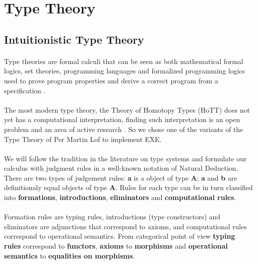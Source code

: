\documentclass[11pt,oneside]{article}
\begin{document}
\newpage
\section{Type Theory}

\subsection{Intuitionistic Type Theory}

\paragraph{}
Type theories are formal calculi that can be seen as both mathematical
formal logics, set theories, programming languages and formalized
programming logics used to prove program properties and derive a correct program from a specification \cite{nordstrom}.

\paragraph{}
The most modern type theory, the Theory of Homotopy Types (HoTT) \cite{pelayo} does not yet has a computational interpretation, finding
such interpretation is an open problem and
an area of active research \cite{sojakova}. So we chose one of the variants of the Type Theory of Per Martin Lof \cite{lof} to implement EXE.

\paragraph{}
We will follow the tradition in the literature on type systems \cite{henk1} and formulate our calculus with judgment rules in a well-known
notation of Natural Deduction. There are two types of judgement rules: {\bf a} is a object of type {\bf A};
{\bf a} and {\bf b} are definitionaly equal objects of type {\bf A}.
Rules for each type can be in turn classified into {\bf formations}, {\bf introductions}, {\bf eliminators} and {\bf computational rules}.

\paragraph{}
Formation rules are typing rules,
introductions (type constructors) and eliminators are adjunctions that correspond to axioms,
and computational rules correspond to operational semantics.
From categorical point of view {\bf typing rules} correspond to {\bf functors},
{\bf axioms} to {\bf morphisms} and {\bf operational semantics} to {\bf equalities on morphisms}.
\end{document}
